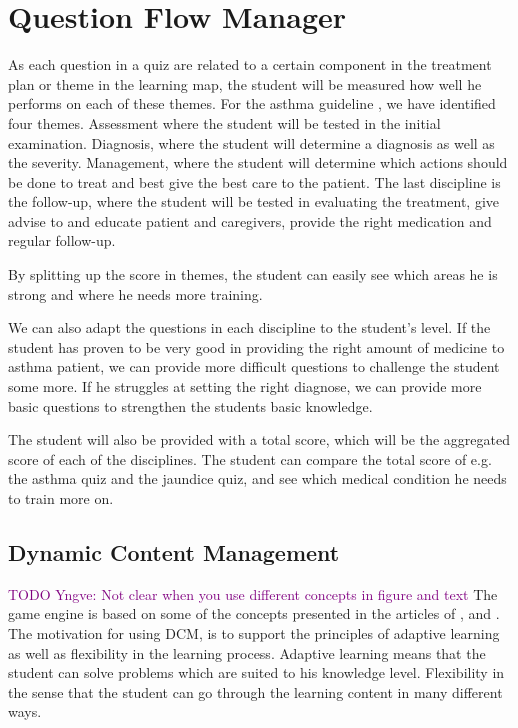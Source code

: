\section{Question Flow Manager}



As each question in a quiz are related to a certain component in the treatment plan or theme in the learning map, the student will be measured how well he performs on each of these themes. For the asthma guideline \parencite{RepublicofKeny2016}, we have identified four themes. Assessment where the student will be tested in the initial examination. Diagnosis, where the student will determine a diagnosis as well as the severity. Management, where the student will determine which actions should be done to treat and best give the best care to the patient. The last discipline is the follow-up, where the student will be tested in evaluating the treatment, give advise to and educate patient and caregivers, provide the right medication and regular follow-up.

By splitting up the score in themes, the student can easily see which areas he is strong and where he needs more training. 



We can also adapt the questions in each discipline to the student's level. If the student has proven to be very good in providing the right amount of medicine to asthma patient, we can provide more difficult questions to challenge the student some more. If he struggles at setting the right diagnose, we can provide more basic questions to strengthen the students basic knowledge. 




The student will also be provided with a total score, which will be the aggregated score of each of the disciplines. The student can compare the total score of e.g. the asthma quiz and the jaundice quiz, and see which medical condition he needs to train more on.



\subsection{Dynamic Content Management}
\textcolor{purple}{TODO Yngve: Not clear when you use different concepts in figure and text}
The game engine is based on some of the concepts presented in the articles of \textcite{Eide2008}, \textcite{Kristensen2011} and \textcite{Kristensen2013}. The motivation for using DCM, is to support the principles of adaptive learning as well as flexibility in the learning process. Adaptive learning means that the student can solve problems which are suited to his knowledge level. Flexibility in the sense that the student can go through the learning content in many different ways.

